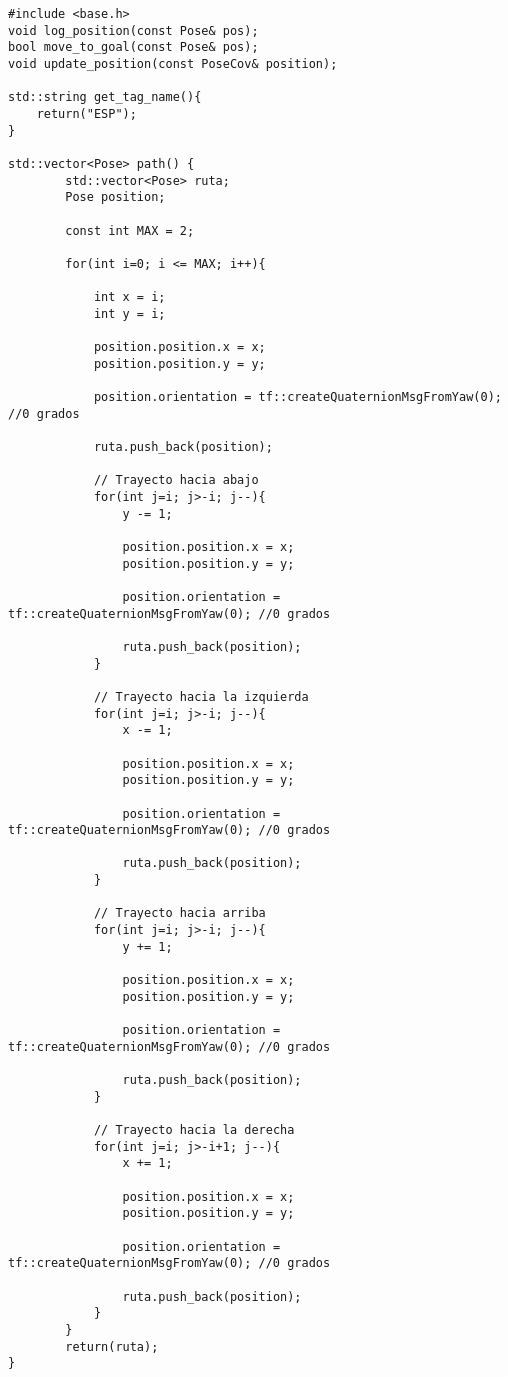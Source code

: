 \begin{lstlisting}
#include <base.h>
void log_position(const Pose& pos);
bool move_to_goal(const Pose& pos);
void update_position(const PoseCov& position);

std::string get_tag_name(){
    return("ESP");
}

std::vector<Pose> path() {
        std::vector<Pose> ruta;
        Pose position;

        const int MAX = 2;

        for(int i=0; i <= MAX; i++){

            int x = i;
            int y = i;

            position.position.x = x;
            position.position.y = y;

            position.orientation = tf::createQuaternionMsgFromYaw(0); //0 grados

            ruta.push_back(position);

            // Trayecto hacia abajo
            for(int j=i; j>-i; j--){
                y -= 1;

                position.position.x = x;
                position.position.y = y;

                position.orientation = tf::createQuaternionMsgFromYaw(0); //0 grados

                ruta.push_back(position);
            }

            // Trayecto hacia la izquierda
            for(int j=i; j>-i; j--){
                x -= 1;

                position.position.x = x;
                position.position.y = y;

                position.orientation = tf::createQuaternionMsgFromYaw(0); //0 grados

                ruta.push_back(position);
            }

            // Trayecto hacia arriba
            for(int j=i; j>-i; j--){
                y += 1;

                position.position.x = x;
                position.position.y = y;

                position.orientation = tf::createQuaternionMsgFromYaw(0); //0 grados

                ruta.push_back(position);
            }

            // Trayecto hacia la derecha
            for(int j=i; j>-i+1; j--){
                x += 1;

                position.position.x = x;
                position.position.y = y;

                position.orientation = tf::createQuaternionMsgFromYaw(0); //0 grados

                ruta.push_back(position);
            }
        }
        return(ruta);
}
\end{lstlisting}

